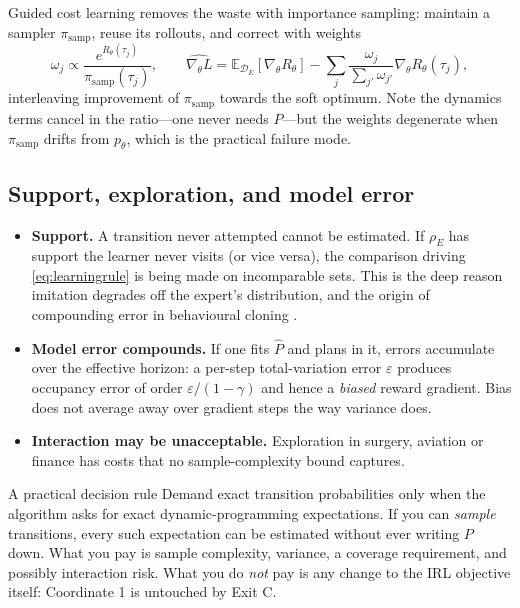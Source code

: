 \documentclass[11pt]{article}
\theoremstyle{plain}
\theoremstyle{definition}
\theoremstyle{remark}
\newcommand{\E}{\mathbb{E}}
\newcommand{\samp}{\mathrm{samp}}
\begin{document}
Guided cost learning \cite{finn2016} removes the waste with importance
sampling: maintain a sampler $\pi_\samp$, reuse its rollouts, and correct
with weights
\begin{equation}
\omega_j \propto \frac{e^{R_\theta(\tau_j)}}{\pi_\samp(\tau_j)}, \qquad
\widehat{\nabla_\theta L} = \E_{\mathcal{D}_E}[\nabla_\theta R_\theta] -
\sum_j \frac{\omega_j}{\sum_{j'}\omega_{j'}} \nabla_\theta R_\theta(\tau_j),
\label{eq:gclgrad}
\end{equation}
interleaving improvement of $\pi_\samp$ towards the soft optimum. Note the
dynamics terms cancel in the ratio---one never needs $P$---but the weights
degenerate when $\pi_\samp$ drifts from $p_\theta$, which is the practical
failure mode.

\subsection{Support, exploration, and model error}

\begin{itemize}
\item \textbf{Support.} A transition never attempted cannot be estimated.
If $\rho_E$ has support the learner never visits (or vice versa), the
comparison driving \eqref{eq:learningrule} is being made on incomparable
sets. This is the deep reason imitation degrades off the expert's
distribution, and the origin of compounding error in behavioural cloning
\cite{bagnell2014}.
\item \textbf{Model error compounds.} If one fits $\widehat P$ and plans
in it, errors accumulate over the effective horizon: a per-step
total-variation error $\varepsilon$ produces occupancy error of order
$\varepsilon/(1-\gamma)$ and hence a \emph{biased} reward gradient. Bias
does not average away over gradient steps the way variance does.
\item \textbf{Interaction may be unacceptable.} Exploration in surgery,
aviation or finance has costs that no sample-complexity bound captures.
\end{itemize}

\begin{graybox}{A practical decision rule}
Demand exact transition probabilities only when the algorithm asks for
exact dynamic-programming expectations. If you can \emph{sample}
transitions, every such expectation can be estimated without ever writing
$P$ down. What you pay is sample complexity, variance, a coverage
requirement, and possibly interaction risk. What you do \emph{not} pay is
any change to the IRL objective itself: Coordinate 1 is untouched by
Exit C.
\end{graybox}
\end{document}
